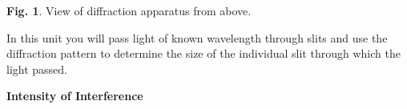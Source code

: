 \vspace{0.1cm}
\begin{center}
{\centering {} \par}
\end{center}
\vspace{0.1cm}

{\centering \textbf{Fig. 1}. View of diffraction apparatus from above.\par}

In this unit you will  pass light of known wavelength through slits 
and use the diffraction pattern to determine the size of the individual
slit through which the light passed.

\newpage

\textbf{Intensity of Interference }

